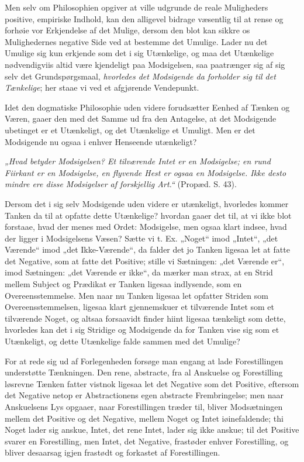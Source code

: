 \documentclass[12pt,a4paper]{book}
\begin{document}
Men selv om Philosophien opgiver at ville udgrunde de reale
Muligheders positive, empiriske Indhold, kan den
alligevel bidrage væsentlig til at rense og forhøie vor Erkjendelse af
det Mulige, dersom den blot kan sikkre os Mulighedernes negative Side
ved at bestemme det Umulige. Lader nu det Umulige sig kun erkjende
som det i sig Utænkelige, og maa det Utænkelige nødvendigviis altid
være kjendeligt paa Modsigelsen, saa paatrænger sig af sig selv det
Grundspørgsmaal, \emph{hvorledes det Modsigende da forholder sig til
det Tænkelige}; her staae vi ved et afgjørende Vendepunkt.

Idet den dogmatiske Philosophie uden videre forudsætter Eenhed af
Tænken og Væren, gaaer den med det Samme ud fra den Antagelse, at det
Modsigende ubetinget er et Utænkeligt, og det Utænkelige et Umuligt.
Men er det Modsigende nu ogsaa i enhver Henseende utænkeligt?

\emph{„Hvad betyder Modsigelsen? Et tilværende Intet er en
Modsigelse; en rund Fiirkant er en Modsigelse, en flyvende Hest er
ogsaa en Modsigelse. Ikke desto mindre ere disse Modsigelser af
forskjellig Art.“} (Propæd. S. 43).

Dersom det i sig selv Modsigende uden videre er utænkeligt, hvorledes
kommer Tanken da til at opfatte dette Utænkelige? hvordan gaaer det
til, at vi ikke blot forstaae, hvad der menes med Ordet: Modsigelse,
men ogsaa klart indsee, hvad der ligger i Modsigelsens Væsen? Sætte
vi t. Ex. „Noget“ imod „Intet“, „det Værende“ imod „det Ikke-Værende“,
da falder det jo Tanken ligesaa let at fatte det Negative, som at
fatte det Positive; stille vi Sætningen: „det Værende er“, imod
Sætningen: „det Værende er ikke“, da mærker man strax, at en Strid
mellem Subject og Prædikat er Tanken ligesaa indlysende, som en
Overeensstemmelse. Men naar nu Tanken ligesaa let opfatter Striden
som Overeensstemmelsen, ligesaa klart gjennemskuer et tilværende Intet
som et tilværende Noget, og altsaa forsaavidt finder hiint ligesaa
tænkeligt som
dette, hvorledes kan det i sig Stridige og Modsigende da for Tanken
vise sig som et Utænkeligt, og dette Utænkelige falde sammen med det
Umulige?

For at rede sig ud af Forlegenheden forsøge man engang at lade
Forestillingen understøtte Tænkningen. Den rene, abstracte, fra al
Anskuelse og Forestilling løsrevne Tænken fatter vistnok ligesaa let
det Negative som det Positive, eftersom det Negative netop er
Abstractionens egen abstracte Frembringelse; men naar Anskuelsens Lys
opgaaer, naar Forestillingen træder til, bliver Modsætningen mellem
det Positive og det Negative, mellem Noget og Intet iøinefaldende; thi
Noget lader sig anskue, Intet, det rene Intet, lader sig ikke anskue;
til det Positive svarer en Forestilling, men Intet, det Negative,
frastøder enhver Forestilling, og bliver desaarsag igjen frastødt og
forkastet af Forestillingen.
\end{document}
